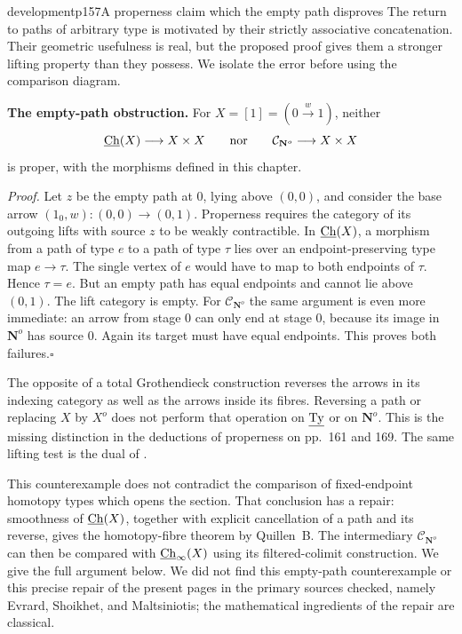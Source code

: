 \begin{dcomment}{development}{p157}{A properness claim which the empty path disproves}
The return to paths of arbitrary type is motivated by their strictly associative concatenation. Their geometric usefulness is real, but the proposed proof gives them a stronger lifting property than they possess. We isolate the error before using the comparison diagram.

\textbf{The empty-path obstruction.}\ours\quad
For $X=[1]=(0\xrightarrow{w}1)$, neither
\[
 \underline{\mathrm{Ch}}(X)\longrightarrow X\times X
 \qquad\text{nor}\qquad
 \mathcal C_{\mathbf N^o}\longrightarrow X\times X
\]
is proper, with the morphisms defined in this chapter.

\emph{Proof.} Let $z$ be the empty path at $0$, lying above $(0,0)$, and consider the base arrow $(1_0,w):(0,0)\to(0,1)$. Properness requires the category of its outgoing lifts with source $z$ to be weakly contractible. In $\underline{\mathrm{Ch}}(X)$, a morphism from a path of type $e$ to a path of type $\tau$ lies over an endpoint-preserving type map $e\to\tau$. The single vertex of $e$ would have to map to both endpoints of $\tau$. Hence $\tau=e$. But an empty path has equal endpoints and cannot lie above $(0,1)$. The lift category is empty. For $\mathcal C_{\mathbf N^o}$ the same argument is even more immediate: an arrow from stage $0$ can only end at stage $0$, because its image in $\mathbf N^o$ has source $0$. Again its target must have equal endpoints. This proves both failures.\hfill$\square$

The opposite of a total Grothendieck construction reverses the arrows in its indexing category as well as the arrows inside its fibres. Reversing a path or replacing $X$ by $X^o$ does not perform that operation on $\underline{\mathrm{Ty}}$ or on $\mathbf N^o$. This is the missing distinction in the deductions of properness on pp.~161 and 169. The same lifting test is the dual of \citet[Theorem~1.2]{Maltsiniotis2005Asphericite}.

This counterexample does not contradict the comparison of fixed-endpoint homotopy types which opens the section. That conclusion has a repair: smoothness of $\underline{\mathrm{Ch}}(X)$, together with explicit cancellation of a path and its reverse, gives the homotopy-fibre theorem by Quillen~B. The intermediary $\mathcal C_{\mathbf N^o}$ can then be compared with $\underline{\mathrm{Ch}}_\infty(X)$ using its filtered-colimit construction. We give the full argument below. We did not find this empty-path counterexample or this precise repair of the present pages in the primary sources checked, namely Evrard, Shoikhet, and Maltsiniotis; the mathematical ingredients of the repair are classical.
\end{dcomment}



